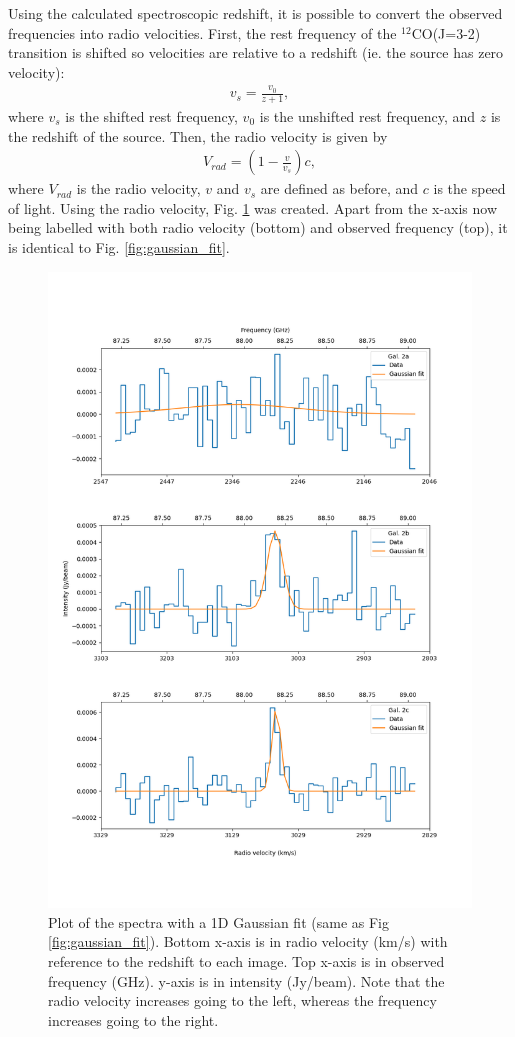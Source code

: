 \documentclass[11pt]{article}
\begin{document}
Using the calculated spectroscopic redshift, it is possible to convert the observed frequencies into radio velocities. First, the rest frequency of the $^{12}$CO(J=3-2) transition is shifted so velocities are relative to a redshift (ie. the source has zero velocity):
\begin{align}\label{eqn:restfreq_shift}
	v_s = \frac{v_0}{z+1},
\end{align}
where $v_s$ is the shifted rest frequency, $v_0$ is the unshifted rest frequency, and $z$ is the redshift of the source. Then, the radio velocity is given by 
\begin{align}\label{eqn:radio_vel}
	V_{rad} = (1 - \frac{v}{v_s})c,
\end{align}
where $V_{rad}$ is the radio velocity, $v$ and $v_s$ are defined as before, and $c$ is the speed of light. Using the radio velocity, Fig. \ref{fig:redshift_axis} was created. Apart from the x-axis now being labelled with both radio velocity (bottom) and observed frequency (top), it is identical to Fig. \ref{fig:gaussian_fit}.

\begin{figure}[!htbp]
    \centering
    \includegraphics[width=0.8\linewidth]{../figs/redshift_axis_plot.png}
	\caption{Plot of the spectra with a 1D Gaussian fit (same as Fig \ref{fig:gaussian_fit}). Bottom x-axis is in radio velocity (km/s) with reference to the redshift to each image. Top x-axis is in observed frequency (GHz). y-axis is in intensity (Jy/beam). Note that the radio velocity increases going to the left, whereas the frequency increases going to the right.}
    \label{fig:redshift_axis}
\end{figure}
\end{document}
